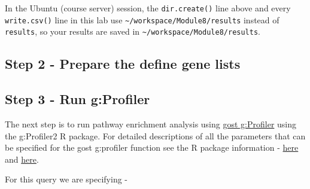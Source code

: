\documentclass[
]{book}
\newenvironment{Shaded}{\begin{snugshade}}{\end{snugshade}}
\newcommand{\DecValTok}[1]{\textcolor[rgb]{0.00,0.00,0.81}{#1}}
\newcommand{\FloatTok}[1]{\textcolor[rgb]{0.00,0.00,0.81}{#1}}
\newcommand{\FunctionTok}[1]{\textcolor[rgb]{0.13,0.29,0.53}{\textbf{#1}}}
\newcommand{\NormalTok}[1]{#1}
\newcommand{\OtherTok}[1]{\textcolor[rgb]{0.56,0.35,0.01}{#1}}
\newcommand{\SpecialCharTok}[1]{\textcolor[rgb]{0.81,0.36,0.00}{\textbf{#1}}}
\newcommand{\StringTok}[1]{\textcolor[rgb]{0.31,0.60,0.02}{#1}}
\newenvironment{rmd-caution}{\begin{tcolorbox}[colback=orange!5,colframe=orange!75!black,title=Caution]}{\end{tcolorbox}}
\begin{document}
\begin{rmd-caution}
In the Ubuntu (course server) session, the \texttt{dir.create()} line
above and every \texttt{write.csv()} line in this lab use
\texttt{\textasciitilde{}/workspace/Module8/results} instead of
\texttt{results}, so your results are saved in
\texttt{\textasciitilde{}/workspace/Module8/results}.
\end{rmd-caution}

\subsection{Step 2 - Prepare the define gene lists}\label{step-2---prepare-the-define-gene-lists}

\begin{Shaded}
\end{Shaded}

\subsection{Step 3 - Run g:Profiler}\label{step-3---run-gprofiler}

The next step is to run pathway enrichment analysis using \href{https://biit.cs.ut.ee/gprofiler/gost}{gost g:Profiler} using the g:Profiler2 R package.
For detailed descriptions of all the parameters that can be specified for the gost g:profiler function see the R package information - \href{https://cran.r-project.org/web/packages/gprofiler2/index.html}{here} and \href{https://rdrr.io/cran/gprofiler2/man/gost.html}{here}.

For this query we are specifying -
\end{document}
